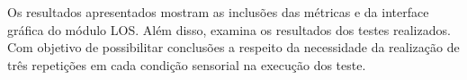 Os resultados apresentados mostram as inclusões das métricas e da interface gráfica do módulo LOS. Além disso, examina os resultados dos testes realizados. Com objetivo de possibilitar conclusões a respeito da necessidade da realização de três repetições em cada condição sensorial na execução dos teste.


